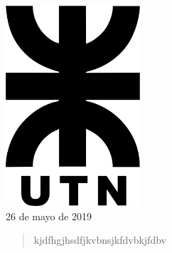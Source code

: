 \documentclass[12pt]{article}
\begin{document}
\begin{titlepage}
\begin{center}
\begin{minipage}{0.8\textwidth}
\begin{flushleft}
\end{flushleft}
\end{minipage}\\[2.5cm]







\includegraphics[width=5cm]{./logos/logo_utn.png}\\[1cm] 				%
 {\large 26 de mayo de 2019}											%

\newpage %
\end{center}

\begin{abstract}
kjdfhgjhsdfjkvbnsjkfdvbkjfdbv
\end{abstract}


\tableofcontents\vspace{2.5cm}
\thispagestyle{empty}
\end{titlepage}
\newpage
\pagestyle{fancy}
\end{document}
